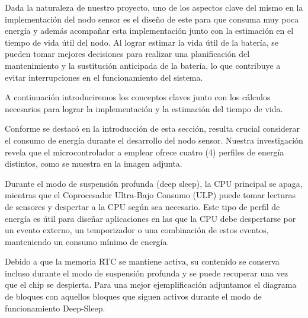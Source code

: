 
Dada la naturaleza de nuestro proyecto, uno de los aspectos clave del mismo en la implementación del nodo sensor es el diseño de este para que consuma muy poca energía y además acompañar esta implementación junto con la estimación en el tiempo de vida útil del nodo.
Al lograr estimar la vida útil de la batería, se pueden tomar mejores decisiones para realizar una planificación del mantenimiento y la sustitución anticipada de la batería, lo que contribuye a evitar interrupciones en el funcionamiento del sistema.

A continuación introduciremos los conceptos claves junto con los cálculos necesarios para lograr la implementación y la estimación del tiempo de vida.

Conforme se destacó en la introducción de esta sección, resulta crucial considerar el consumo de energía durante el desarrollo del nodo sensor. Nuestra investigación revela que el microcontrolador a emplear ofrece cuatro (4) perfiles de energía distintos, como se muestra en la imagen adjunta.


Durante el modo de suspensión profunda (deep sleep), la CPU principal se apaga, mientras que el Coprocesador Ultra-Bajo Consumo (ULP) puede tomar lecturas de sensores y despertar a la CPU según sea necesario. Este tipo de perfil de energía es útil para diseñar aplicaciones en las que la CPU debe despertarse por un evento externo, un temporizador o una combinación de estos eventos, manteniendo un consumo mínimo de energía.

Debido a que la memoria RTC se mantiene activa, su contenido se conserva incluso durante el modo de suspensión profunda y se puede recuperar una vez que el chip se despierta. Para una mejor ejemplificación adjuntamos el diagrama de bloques con aquellos bloques que siguen activos durante el modo de funcionamiento Deep-Sleep.


